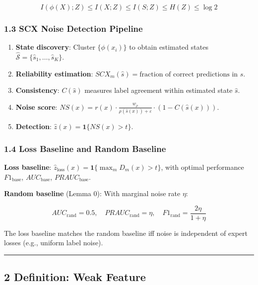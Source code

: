 \documentclass[
  12pt,
]{ctexart}
\providecommand{\tightlist}{%
  \setlength{\itemsep}{0pt}\setlength{\parskip}{0pt}}
\begin{document}
\[I(\phi(X); Z) \leq I(X; Z) \leq I(S; Z) \leq H(Z) \leq \log 2\]

\subsubsection{1.3 SCX Noise Detection
Pipeline}\label{scx-noise-detection-pipeline}

\begin{enumerate}
\def\labelenumi{\arabic{enumi}.}
\tightlist
\item
  \textbf{State discovery}: Cluster \(\{\phi(x_i)\}\) to obtain
  estimated states
  \(\hat{\mathcal{S}} = \{\hat{s}_1, \dots, \hat{s}_K\}\).
\item
  \textbf{Reliability estimation}:
  \(SCX_m(\hat{s}) = \text{fraction of correct predictions in } \hat{s}\).
\item
  \textbf{Consistency}: \(C(\hat{s})\) measures label agreement within
  estimated state \(\hat{s}\).
\item
  \textbf{Noise score}:
  \(NS(x) = r(x) \cdot \frac{w_\rho}{\rho(\hat{s}(x)) + \varepsilon} \cdot (1 - C(\hat{s}(x)))\).
\item
  \textbf{Detection}: \(\hat{z}(x) = \mathbf{1}\{NS(x) > t\}\).
\end{enumerate}

\subsubsection{1.4 Loss Baseline and Random
Baseline}\label{loss-baseline-and-random-baseline}

\textbf{Loss baseline}:
\(\hat{z}_{\text{loss}}(x) = \mathbf{1}\{\max_m D_m(x) > t\}\), with
optimal performance \(F1_{\text{base}}\), \(AUC_{\text{base}}\),
\(PRAUC_{\text{base}}\).

\textbf{Random baseline} (Lemma 0): With marginal noise rate \(\eta\):

\[AUC_{\text{rand}} = 0.5,\quad PRAUC_{\text{rand}} = \eta,\quad F1_{\text{rand}} = \frac{2\eta}{1+\eta}\]

The loss baseline matches the random baseline iff noise is independent
of expert losses (e.g., uniform label noise).

\begin{center}\rule{0.5\linewidth}{0.5pt}\end{center}

\subsection{2 Definition: Weak Feature}\label{definition-weak-feature}
\end{document}
